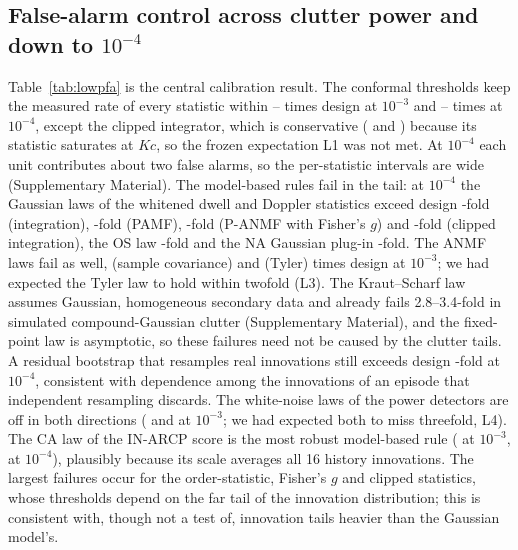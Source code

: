 \documentclass[journal]{IEEEtran}
\begin{document}
\subsection{False-alarm control across clutter power and down to $10^{-4}$}\label{sec:fa}
\begin{table}[!t]
\centering\footnotesize
\caption{Measured false-alarm rate / design $\alpha$ on IPIX test thirds (\NUnitsConf{} units, pooled). Conformal: split-conformal threshold. Model-based: the rule in parentheses at the fitted model. Bold: outside $[0.5,2]$.}
\label{tab:lowpfa}
\setlength{\tabcolsep}{2.2pt}

\end{table}
Table~\ref{tab:lowpfa} is the central calibration result. The conformal thresholds keep the measured rate of every statistic within \LConfMinThree--\LConfMaxThree{} times design at $10^{-3}$ and \LConfMinFour--\LConfMaxFour{} times at $10^{-4}$, except the clipped integrator, which is conservative (\LClipConfThree{} and \LClipConfFour) because its statistic saturates at $Kc$, so the frozen expectation L1 was not met. At $10^{-4}$ each unit contributes about two false alarms, so the per-statistic intervals are wide (Supplementary Material). The model-based rules fail in the tail: at $10^{-4}$ the Gaussian laws of the whitened dwell and Doppler statistics exceed design \LDinFour-fold (integration), \LPamfFour-fold (PAMF), \LPanmfFour-fold (P-ANMF with Fisher's $g$) and \LClipGFour-fold (clipped integration), the OS law \LOsFour-fold and the NA Gaussian plug-in \LNaFour-fold. The ANMF laws fail as well, \LScmThree{} (sample covariance) and \LFpThree{} (Tyler) times design at $10^{-3}$; we had expected the Tyler law to hold within twofold (L3). The Kraut--Scharf law assumes Gaussian, homogeneous secondary data and already fails 2.8--3.4-fold in simulated compound-Gaussian clutter (Supplementary Material), and the fixed-point law is asymptotic, so these failures need not be caused by the clutter tails. A residual bootstrap that resamples real innovations still exceeds design \LBootFour-fold at $10^{-4}$, consistent with dependence among the innovations of an episode that independent resampling discards. The white-noise laws of the power detectors are off in both directions (\LCaWhiteThree{} and \LOsRawThree{} at $10^{-3}$; we had expected both to miss threefold, L4). The CA law of the IN-ARCP score is the most robust model-based rule (\LInAnalThree{} at $10^{-3}$, \LInAnalFour{} at $10^{-4}$), plausibly because its scale averages all 16 history innovations. The largest failures occur for the order-statistic, Fisher's $g$ and clipped statistics, whose thresholds depend on the far tail of the innovation distribution; this is consistent with, though not a test of, innovation tails heavier than the Gaussian model's.
\end{document}
